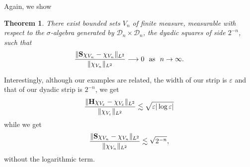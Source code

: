 \documentclass{article}
\newtheorem{theorem}{Theorem}
\def\H{{\bf H}}
\def\S{{\bf S}}
\begin{document}
	Again, we show

	\begin{theorem}\label{T2}
		There exist bounded sets $V_n$
		of finite measure, measurable with respect to the $\sigma$-algebra generated by
		$\mathcal{D}_n\times\mathcal{D}_n$, the dyadic squares of side $2^{- n}$, such that
		\[ \frac{\| \S \chi_{V_n} - \chi_{V_n} \|_{L^2}}{\|
			\chi_{V_n} \|_{L^2}} \longrightarrow 0 \ \text{ as } \ n \rightarrow \infty .\]
	\end{theorem}


	Interestingly, although our examples are related, the width of our strip
	is $\varepsilon$ and that of our dyadic strip is $2^{- n}$, we get
	\[ \frac{\|  \H \chi_{V_{\varepsilon}} -
		\chi_{V_{\varepsilon}} \|_{L^2}}{\| \chi_{V_{\varepsilon}} \|_{L^2}}
	\lesssim \sqrt{\varepsilon | \log \varepsilon |} \]
	while we get
	\[ \frac{\| \S \chi_{V_n} - \chi_{V_n} \|_{L^2}}{\|
		\chi_{V_n} \|_{L^2}} \lesssim \sqrt{2^{- n}} , \]
        without the logarithmic term. 
\end{document}
